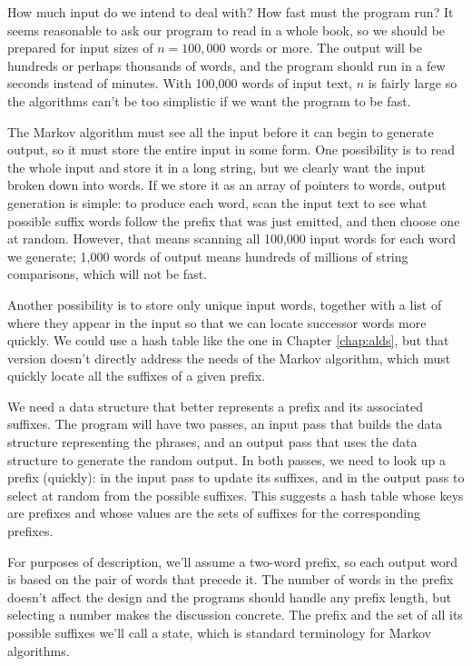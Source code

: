 How much input do we intend to deal with? How fast must the program run? It
seems reasonable to ask our program to read in a whole book, so we should
be prepared for input sizes of $n = 100,000$ words or more. The output will
be hundreds or perhaps thousands of words, and the program should run in a
few seconds instead of minutes. With 100,000 words of input text, $n$ is
fairly large so the algorithms can't be too simplistic if we want the
program to be fast.

The Markov algorithm must see all the input before it can begin to generate
output, so it must store the entire input in some form. One possibility is
to read the whole input and store it in a long string, but we clearly want
the input broken down into words. If we store it as an array of pointers to
words, output generation is simple: to produce each word, scan the input
text to see what possible suffix words follow the prefix that was just
emitted, and then choose one at random. However, that means scanning all
100,000 input words for each word we generate; 1,000 words of output means
hundreds of millions of string comparisons, which will not be fast.

Another possibility is to store only unique input words, together with a
list of where they appear in the input so that we can locate successor
words more quickly.  We could use a hash table like the one in Chapter
\ref{chap:alds}, but that version doesn't directly address the needs of the
Markov algorithm, which must quickly locate all the suffixes of a given
prefix.

We need a data structure that better represents a prefix and its associated
suffixes.  The program will have two passes, an input pass that builds the
data structure representing the phrases, and an output pass that uses the
data structure to generate the random output. In both passes, we need to
look up a prefix (quickly): in the input pass to update its suffixes, and
in the output pass to select at random from the possible suffixes. This
suggests a hash table whose keys are prefixes and whose values are the sets
of suffixes for the corresponding prefixes.

For purposes of description, we'll assume a two-word prefix, so each output
word is based on the pair of words that precede it. The number of words in
the prefix doesn't affect the design and the programs should handle any
prefix length, but selecting a number makes the discussion concrete. The
prefix and the set of all its possible suffixes we'll call a state, which
is standard terminology for Markov algorithms.

